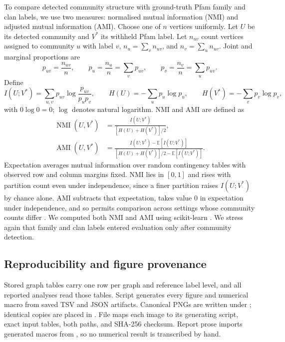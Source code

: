 \documentclass[11pt,a4paper]{article}
\begin{document}
To compare detected community structure with ground-truth Pfam family and
clan labels, we use two measures: normalised mutual information (NMI) and
adjusted mutual information (AMI). Choose one of \(n\) vertices uniformly. Let \(U\) be its detected community and
\(V^*\) its withheld Pfam label. Let \(n_{uv}\) count vertices assigned to
community \(u\) with label \(v\), \(n_u=\sum_v n_{uv}\), and
\(n_v=\sum_u n_{uv}\). Joint and marginal proportions are
\[
p_{uv}=\frac{n_{uv}}n,\qquad
p_u=\frac{n_u}n=\sum_v p_{uv},\qquad
p_v=\frac{n_v}n=\sum_u p_{uv}.
\]
Define
\[
I(U;V^*)=\sum_{u,v}p_{uv}\log\frac{p_{uv}}{p_u p_v},\qquad
H(U)=-\sum_u p_u\log p_u,\qquad
H(V^*)=-\sum_v p_v\log p_v,
\]
with \(0\log0=0\); \(\log\) denotes natural logarithm. NMI and AMI are defined as
\begin{align*}
\operatorname{NMI}(U,V^*)&=\frac{I(U;V^*)}{[H(U)+H(V^*)]/2},\\
\operatorname{AMI}(U,V^*)&=
\frac{I(U;V^*)-\mathbb E[I(U;V^*)]}
{[H(U)+H(V^*)]/2-\mathbb E[I(U;V^*)]}.
\end{align*}
Expectation averages mutual information over random contingency tables with
observed row and column margins fixed. NMI lies in \([0,1]\) and rises with
partition count even under independence, since a finer partition raises
\(I(U;V^*)\) by chance alone. AMI subtracts that expectation, takes value
\(0\) in expectation under independence, and so permits comparison across
settings whose community counts differ \citep{vinh2010information}. We computed
both NMI and AMI using scikit-learn \citep{pedregosa2011scikitlearn}. We stress
again that family and clan labels entered evaluation only after community
detection.

\subsection{Reproducibility and figure provenance}

Stored graph tables carry one row per graph and reference label level, and all
reported analyses read those tables. Script
 generates every figure and numerical
macro from saved TSV and JSON artifacts. Canonical PNGs are written under
; identical copies are
placed in . File  maps
each image to its generating script, exact input tables, both paths, and
SHA-256 checksum. Report prose imports generated macros from
, so no numerical result is transcribed by
hand.
\end{document}
